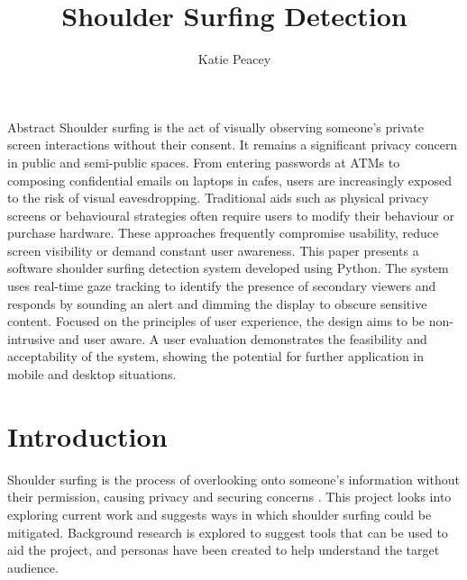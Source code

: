 \documentclass[12pt]{article}
\title{ Shoulder Surfing Detection}
\author{Katie Peacey}
\theoremstyle{plain}
\theoremstyle{definition}
\begin{document}

\maketitle
\studentdeclarations

\begin{frontmatterparagraph}{Abstract}
Shoulder surfing is the act of visually observing someone’s private screen interactions without their consent. It remains a significant privacy concern in public and semi-public spaces. From entering passwords at ATMs to composing confidential emails on laptops in cafes, users are increasingly exposed to the risk of visual eavesdropping. Traditional aids such as physical privacy screens or behavioural strategies often require users to modify their behaviour or purchase hardware. These approaches frequently compromise usability, reduce screen visibility or demand constant user awareness. This paper presents a software shoulder surfing detection system developed using Python. The system uses real-time gaze tracking to identify the presence of secondary viewers and responds by sounding an alert and dimming the display to obscure sensitive content. Focused on the principles of user experience, the design aims to be non-intrusive and user aware. A user evaluation demonstrates the feasibility and acceptability of the system, showing the potential for further application in mobile and desktop situations.
\end{frontmatterparagraph}

\tableofcontents

\listoffigures
\listoftables
\clearpage


\section{Introduction}
\label{sec:intro}

Shoulder surfing is the process of overlooking onto someone’s information without their permission, causing privacy and securing concerns \cite{eiband_understanding_2017}. This project looks into exploring current work and suggests ways in which shoulder surfing could be mitigated. Background research is explored to suggest tools that can be used to aid the project, and personas have been created to help understand the target audience.
\end{document}
